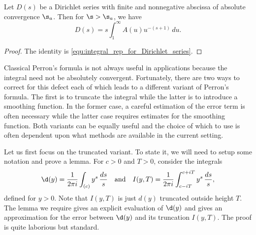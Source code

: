 \documentclass[12pt]{article}
\begin{document}
      \begin{corollary}\label{cor:integral_rep_for_Dirichlet_series}
        Let \(D(s)\) be a Dirichlet series with finite and nonnegative abscissa of absolute convergence \(\s_{a}\). Then for \(\s > \s_{a}\), we have
        \[
          D(s) = s\int_{1}^{\infty}A(u)u^{-(s+1)}\,du.
        \]
      \end{corollary}
      \begin{proof}
        The identity is \cref{equ:integral_rep_for_Dirichlet_series}.
      \end{proof}

      Classical Perron's formula is not always useful in applications because the integral need not be absolutely convergent. Fortunately, there are two ways to correct for this defect each of which leads to a different variant of Perron's formula. The first is to truncate the integral while the latter is to introduce a smoothing function. In the former case, a careful estimation of the error term is often necessary while the latter case requires estimates for the smoothing function. Both variants can be equally useful and the choice of which to use is often dependent upon what methods are available in the current setting.
      
      Let us first focus on the truncated variant. To state it, we will need to setup some notation and prove a lemma. For \(c > 0\) and \(T > 0\), consider the integrals
      \[
        \d(y) = \frac{1}{2\pi i}\int_{(c)}y^{s}\,\frac{ds}{s} \quad \text{and} \quad I(y,T) = \frac{1}{2\pi i}\int_{c-iT}^{c+iT}y^{s}\,\frac{ds}{s},
      \]
      defined for \(y > 0\). Note that \(I(y,T)\) is just \(d(y)\) truncated outside height \(T\). The lemma we require gives an explicit evaluation of \(\d(y)\) and gives an approximation for the error between \(\d(y)\) and its truncation \(I(y,T)\). The proof is quite laborious but standard.
\end{document}
